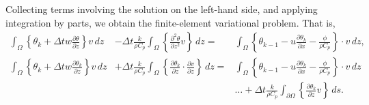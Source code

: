 \documentclass[12pt]{amsart}
\begin{document}
Collecting terms involving the solution on the left-hand side, and applying integration by parts, we obtain the finite-element variational problem.  That is,
\begin{align*}
  \int_\Omega \left\{
    \theta_k 
    + \Delta t w \frac{\partial \theta}{\partial z} 
  \right\} v\, dz 
    &- \Delta t \frac{k}{\rho C_p} 
  \int_\Omega \left\{
    \frac{\partial^2 \theta}{\partial z^2}
  v\right\} \, dz
  =& 
  \int_\Omega\left\{\theta_{k-1} - u\frac{\partial \theta_k}{\partial x} - \frac{\phi}{\rho C_p} \right\}\cdot v\, dz, \\  
  \int_\Omega \left\{
    \theta_k 
    + \Delta t w \frac{\partial \theta_k}{\partial z} 
  \right\} v\, dz 
    &+ \Delta t \frac{k}{\rho C_p} 
  \int_\Omega \left\{
    \frac{\partial\theta_k}{\partial z}
    \cdot \frac{\partial v}{\partial z}
    \right\} \, dz
  =& 
  \int_\Omega\left\{\theta_{k-1} - u\frac{\partial \theta_k}{\partial x} - \frac{\phi}{\rho C_p} \right\}\cdot v\, dz \\  
  & &\dots  + \Delta t \frac{k}{\rho C_p}\int_{\partial \Omega} \left\{ \frac{\partial \theta_k}{\partial z} v \right\}\, ds.\\
  \end{align*}
\end{document}
